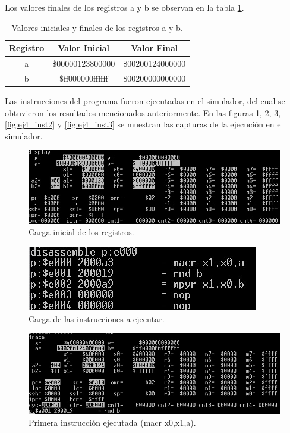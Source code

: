 Los valores finales de los registros a y b se observan en la tabla \ref{tab:ej4_a_b}.

\begin{table}[H]
\centering
\begin{tabular}{|c|c|c|}
\hline
\textbf{Registro} & \textbf{Valor Inicial} & \textbf{Valor Final} \\ \hline
a                 & \$00000123800000       & \$00200124000000     \\ \hline
b                 & \$ff000000ffffff       & \$00200000000000     \\ \hline
\end{tabular}
\caption{Valores iniciales y finales de los registros a y b.}
\label{tab:ej4_a_b}
\end{table}

Las instrucciones del programa fueron ejecutadas en el simulador, del cual se obtuvieron los resultados mencionados anteriormente. En las figuras \ref{fig:ej4_iniregs}, \ref{fig:ej4_insts}, \ref{fig:ej4_inst1}, \ref{fig:ej4_inst2} y \ref{fig:ej4_inst3} se muestran las capturas de la ejecución en el simulador.

\begin{figure}[H]
    \centering
    \includegraphics[scale=1]{figs/ej4/1.jpg}
    \caption{Carga inicial de los registros.}
    \label{fig:ej4_iniregs}
\end{figure}

\begin{figure}[H]
    \centering
    \includegraphics[scale=1]{figs/ej4/2.jpg}
    \caption{Carga de las instrucciones a ejecutar.}
    \label{fig:ej4_insts}
\end{figure}

\begin{figure}[H]
    \centering
    \includegraphics[scale=1]{figs/ej4/3.jpg}
    \caption{Primera instrucción ejecutada (macr x0,x1,a). }
    \label{fig:ej4_inst1}
\end{figure}

